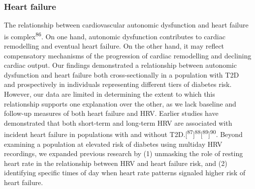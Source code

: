 \documentclass[
  a4paper,
  headsepline=true,
  open=any]{scrbook}
\begin{document}
\hypertarget{heart-failure-1}{%
\subsubsection{Heart failure}\label{heart-failure-1}}

The relationship between cardiovascular autonomic dysfunction and heart
failure is complex\textsuperscript{86}. On one hand, autonomic
dysfunction contributes to cardiac remodelling and eventual heart
failure. On the other hand, it may reflect compensatory mechanisms of
the progression of cardiac remodelling and declining cardiac output. Our
findings demonstrated a relationship between autonomic dysfunction and
heart failure both cross-sectionally in a population with T2D and
prospectively in individuals representing different tiers of diabetes
risk. However, our data are limited in determining the extent to which
this relationship supports one explanation over the other, as we lack
baseline and follow-up measures of both heart failure and HRV. Earlier
studies have demonstrated that both short-term and long-term HRV are
associated with incident heart failure in populations with and without
T2D.{[}\textsuperscript{87}{]}\textsuperscript{88}{[}\textsuperscript{89}{]}\textsuperscript{90}.
Beyond examining a population at elevated risk of diabetes using
multiday HRV recordings, we expanded previous research by (1) unmasking
the role of resting heart rate in the relationship between HRV and heart
failure risk, and (2) identifying specific times of day when heart rate
patterns signaled higher risk of heart failure.
\end{document}
